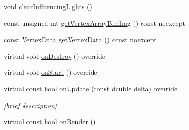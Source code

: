 \begin{DoxyCompactItemize}
\item 
void \hyperlink{class_graphics_1_1_renderable_a448be1ad2063cb3ff8b901a94ae0b566}{clear\+Influencing\+Lights} ()
\item 
const unsigned int \hyperlink{class_graphics_1_1_renderable_afde066c6e5ab15ce9b055f9f8f4593ff}{get\+Vertex\+Array\+Binding} () const noexcept
\item 
const \hyperlink{class_graphics_1_1_vertex_data}{Vertex\+Data} \hyperlink{class_graphics_1_1_renderable_a1d304b7063ae0acdef62b8041258a10b}{get\+Vertex\+Data} () const noexcept
\item 
virtual void \hyperlink{class_graphics_1_1_renderable_a6e20996de55215db7ffae2792aaaa88e}{on\+Destroy} () override
\item 
virtual void \hyperlink{class_graphics_1_1_renderable_a7433551970cd25e0241a4a5bb756ba50}{on\+Start} () override
\item 
virtual const bool \hyperlink{class_graphics_1_1_renderable_a7d0e820c55cb7f5c552aa0c1e846db76}{on\+Update} (const double delta) override
\begin{DoxyCompactList}\small\item\em \mbox{[}brief description\mbox{]} \end{DoxyCompactList}\item 
virtual const bool \hyperlink{class_graphics_1_1_renderable_afafd0e6147c73090234670934bbb8cbb}{on\+Render} ()
\end{DoxyCompactItemize}
